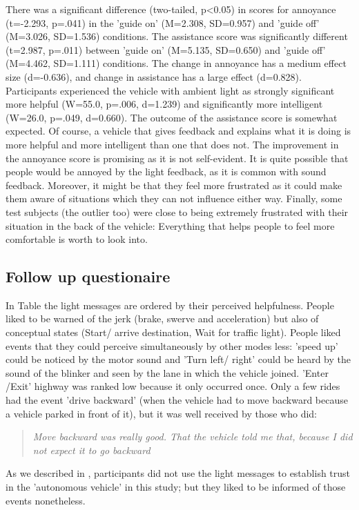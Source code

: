 There was a significant difference (two-tailed, p<0.05) in scores for annoyance (t=-2.293, p=.041) in the 'guide on' (M=2.308, SD=0.957) and 'guide off' (M=3.026, SD=1.536) conditions. 
The assistance score was significantly different (t=2.987, p=.011) between 'guide on' (M=5.135, SD=0.650) and 'guide off' (M=4.462, SD=1.111) conditions. The change in annoyance has a medium effect size (d=-0.636), and change in assistance has a large effect (d=0.828). Participants experienced the vehicle with ambient light as strongly significant more helpful (W=55.0, p=.006, d=1.239) and significantly more intelligent (W=26.0, p=.049, d=0.660). The outcome of the assistance score is somewhat expected. Of course, a vehicle that gives feedback and explains what it is doing is more helpful and more intelligent than one that does not. The improvement in the annoyance score is promising as it is not self-evident. It is quite possible that people would be annoyed by the light feedback, as it is common with sound feedback. Moreover, it might be that they feel more frustrated as it could make them aware of situations which they can not influence either way. Finally, some test subjects (the outlier too) were close to being extremely frustrated with their situation in the back of the vehicle: Everything that helps people to feel more comfortable is worth to look into. 


\subsection{Follow up questionaire}
In Table \emph{} the light messages are ordered by their perceived helpfulness. People liked to be warned of the jerk (brake, swerve and acceleration) but also of conceptual states (Start/ arrive destination, Wait for traffic light). People liked events that they could perceive simultaneously by other modes less: 'speed up' could be noticed by the motor sound and 'Turn left/ right' could be heard by the sound of the blinker and seen by the lane in which the vehicle joined. 'Enter /Exit' highway was ranked low because it only occurred once. Only a few rides had the event 'drive backward' (when the vehicle had to move backward because a vehicle parked in front of it), but it was well received by those who did: \begin{quotation}\emph{Move backward was really good. That the vehicle told me that, because I did not expect it to go backward}\end{quotation} As we described in \emph{}, participants did not use the light messages to establish trust in the 'autonomous vehicle' in this study; but they liked to be informed of those events nonetheless. 

